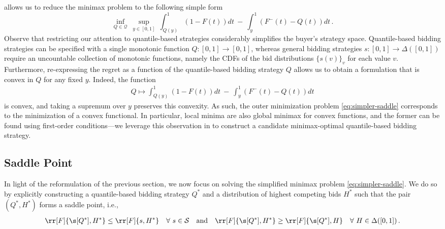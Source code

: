  allows us to reduce the minimax problem to the following simple form
\begin{equation}
\label{eq:simpler-saddle}
	\inf_{Q \in \mathcal{Q}}\ \sup_{y \in [0,1]}\ \int_{Q(y)}^1 (1 - F(t)) dt\ -\ \int_y^1 (F^-(t) - Q(t)) dt \,.
\end{equation}
Observe that restricting our attention to quantile-based strategies considerably simplifies the buyer's strategy space. Quantile-based bidding strategies can be specified with a single monotonic function $Q:[0,1] \to [0,1]$, whereas general bidding strategies $s: [0,1] \to \Delta([0,1])$ require an uncountable collection of monotonic functions, namely the CDFs of the bid distributions $\{s(v)\}_v$ for each value $v$. %
Furthermore, re-expressing the regret as a function of the quantile-based bidding strategy $Q$ allows us to obtain a formulation that is convex in $Q$ for any fixed $y$. Indeed, the function
\begin{align*}
	Q \longmapsto \int_{Q(y)}^1 (1 - F(t)) dt\ -\ \int_y^1 (F^-(t) - Q(t)) dt
\end{align*}
is convex, and taking a supremum over $y$ preserves this convexity. As such, the outer minimization problem \eqref{eq:simpler-saddle} corresponds to the minimization of a convex functional. In particular, local minima are also global minimax for convex functions, and the former can be found using first-order conditions---we leverage this observation in  to construct a candidate minimax-optimal quantile-based bidding strategy.



\subsection{Saddle Point}\label{sec:saddle_point}


In light of the reformulation of the previous section, we now focus on solving the simplified minimax problem \eqref{eq:simpler-saddle}.
We do so by explicitly constructing a quantile-based bidding strategy $Q^*$ and a distribution of highest competing bids $H^*$ such that the pair $(Q^*, H^*)$ forms a saddle point, i.e.,
\begin{align*}
	\rr[F]{\s[Q^*], H^*} \leq \rr[F]{s, H^*} \quad \forall\ s \in \mathcal{S} \quad \text{and} \quad \rr[F]{\s[Q^*], H^*} \geq \rr[F]{\s[Q^*],H} \quad \forall\ H \in \Delta([0,1])\,.
\end{align*}


